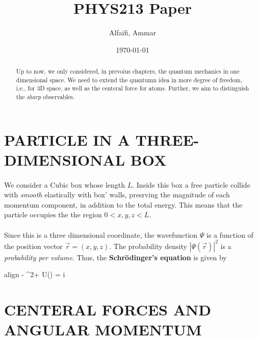 \documentclass[twocolumn]{article}
\title{PHYS213 Paper}
\author{Alfaifi, Ammar}
\date{\today}
\newcommand{\coloredeq}[2]{\begin{empheq}[box=\colorbox{c2}]{align}\label{#1}#2\end{empheq}}
\begin{document}
    \maketitle
    \begin{abstract}
        Up to now, we only considered, in prevoius chapters, the quantum mechanics in one dimensional
        space. We need to extend the quantumn idea in more degree of freedom, i.e., for 3D space, as well
        as the centeral force for atoms. Further, we aim to distinguish the \emph{sharp} observables.
    \end{abstract}
    \section{\color{c3}\MakeUppercase{Particle in a Three-Dimensional Box}}
        \paragraph{} %
        \label{par:Particle in A Three-Dimensional Box}
        We consider a Cubic box whose length $L$. Inside this box a free particle collide
        with \emph{smooth} elastically with box' walls, presrving the magnitude of each
        momentum component, in addition to the total energy. This means that the particle occupies the 
        the region $0<x, y, z<L$.

        \paragraph{}
        Since this is a three dimensional coordinate, the wavefunction $\Psi$ is a function of
        the position vector $\vec{r}=(x, y, z)$. The probability density
        $|\Psi(\vec{r})|^2$ is a \emph{probability per volume}. Thus, the \textbf{Schr\"odinger's
        equation} is given by \coloredeq{3D box equation}{
            - \nabla^2\Psi + U(\vec{r}) = i\hbar \frac{\partial \Psi}{\partial t}
        }

    \section{\color{c3}\MakeUppercase{centeral forces and angular momentum}}
\end{document}

